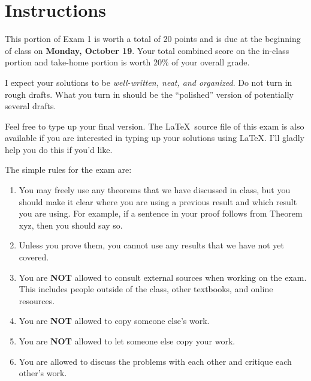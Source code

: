 \documentclass[11pt]{scrartcl}
\theoremstyle{definition}
\begin{document}
\begin{center}

  
  \bigskip
  

\end{center}

\section*{Instructions}

This portion of Exam 1 is worth a total of 20 points and is due at the beginning of class on \textbf{Monday, October 19}.  Your total combined score on the in-class portion and take-home portion is worth 20\% of your overall grade.  

\bigskip

I expect your solutions to be \emph{well-written, neat, and organized}.  Do not turn in rough drafts.  What you turn in should be the ``polished'' version of potentially several drafts.  
 
\bigskip

Feel free to type up your final version.  The \LaTeX\ source file of this exam is also available if you are interested in typing up your solutions using \LaTeX.  I'll gladly help you do this if you'd like.

\bigskip

The simple rules for the exam are:

\begin{enumerate}
\item You may freely use any theorems that we have discussed in class, but you should make it clear where you are using a previous result and which result you are using.  For example, if a sentence in your proof follows from Theorem xyz, then you should say so. 
\item Unless you prove them, you cannot use any results that we have not yet covered.
\item You are \textbf{NOT} allowed to consult external sources when working on the exam.  This includes people outside of the class, other textbooks, and online resources.
\item You are \textbf{NOT} allowed to copy someone else's work.
\item You are \textbf{NOT} allowed to let someone else copy your work.
\item You are allowed to discuss the problems with each other and critique each other's work.
\end{enumerate}
\end{document}
